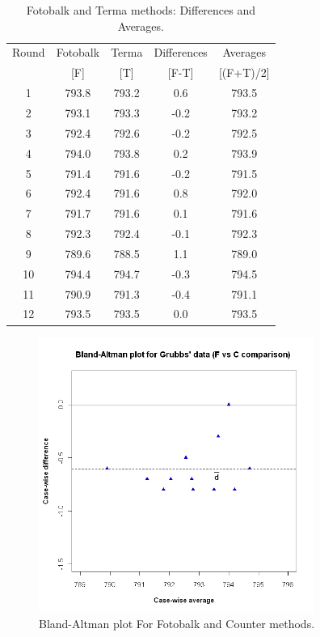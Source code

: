 \documentclass[12pt, a4paper]{report}
\theoremstyle{plain}
\theoremstyle{definition}
\theoremstyle{remark}
\begin{document}
	\begin{table}[h!]
		\renewcommand\arraystretch{0.7}%
		\begin{center}
			\begin{tabular}{|c||c|c||c|c|}
				\hline
				Round & Fotobalk  & Terma  & Differences  & Averages  \\
				&  [F] & [T] & [F-T] &  [(F+T)/2] \\
				\hline
				1 & 793.8 & 793.2 & 0.6 & 793.5 \\
				2 & 793.1 & 793.3 & -0.2 & 793.2 \\
				3 & 792.4 & 792.6 & -0.2 & 792.5 \\
				4 & 794.0 & 793.8 & 0.2 & 793.9 \\
				5 & 791.4 & 791.6 & -0.2 & 791.5 \\
				6 & 792.4& 791.6 & 0.8 & 792.0 \\
				7 & 791.7 & 791.6 & 0.1 & 791.6 \\
				8 & 792.3 & 792.4 & -0.1 & 792.3 \\
				9 & 789.6 & 788.5 & 1.1 & 789.0 \\
				10 & 794.4 & 794.7 & -0.3 & 794.5 \\
				11 & 790.9 & 791.3 & -0.4 & 791.1 \\
				12 & 793.5 & 793.5 & 0.0 & 793.5 \\
				
				\hline
			\end{tabular}
			\caption{Fotobalk and Terma methods: Differences and Averages.}
				\label{GrubbsData2}
		\end{center}
	\end{table}
	
	\newpage
	
	\begin{figure}[h!]
		\begin{center}
			\includegraphics[width=90mm]{images/GrubbsBAplot-noLOA.jpeg}
			\caption{Bland-Altman plot For Fotobalk and Counter methods.}\label{GrubbsBA-noLOA}
		\end{center}
	\end{figure}
	
\end{document}
